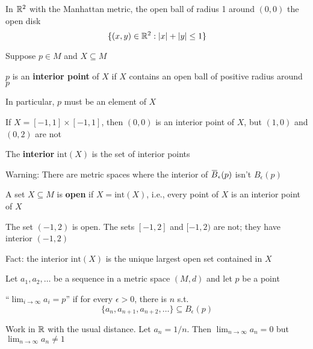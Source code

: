 \documentclass[11pt]{article}
\def \tint {\text{int}}
\begin{document}
\begin{examplle}[]
In \(\mathbb{R}^2\) with the Manhattan metric, the open ball of radius 1 around \((0,0)\) the open disk
\begin{equation*}
\{(x,y)\in\R^2:\abs{x}+\abs{y}\le 1\}
\end{equation*}
\end{examplle}

Suppose \(p\in M\) and \(X\subseteq M\)
\begin{definition}[]
\(p\) is an \textbf{interior point} of \(X\) if \(X\) contains an open ball of positive radius around \(p\)
\end{definition}

In particular, \(p\) must be an element of \(X\)


\begin{examplle}[]
If \(X=[-1,1]\times[-1,1]\), then \((0,0)\) is an interior point of \(X\), but \((1,0)\)
and \((0,2)\) are not
\end{examplle}

\begin{definition}[]
The \textbf{interior} \(\tint(X)\) is the set of interior points
\end{definition}

Warning: There are metric spaces where the interior of \(\barB_\epsilon(p)\) isn't \(B_\epsilon(p)\)

\begin{definition}[]
A set \(X\subseteq M\) is \textbf{open} if \(X=\tint(X)\), i.e., every point of \(X\) is an interior point of \(X\)
\end{definition}

\begin{examplle}[in \(\R\)]
The set \((-1,2)\) is open. The sets \([-1,2]\) and \([-1,2)\) are not; they have interior \((-1,2)\)
\end{examplle}

Fact: the interior \(\tint(X)\) is the unique largest open set contained in \(X\)

Let \(a_1,a_2,\dots\) be a sequence in a metric space \((M,d)\) and let \(p\) be a point
\begin{definition}[]
``\(\lim_{i\to\infty}a_i=p\)'' if for every \(\epsilon>0\), there is \(n\) s.t.
\begin{equation*}
\{a_n,a_{n+1},a_{n+2},\dots\}\subseteq B_\epsilon(p)
\end{equation*}
\end{definition}

\begin{examplle}[]
Work in \(\R\) with the usual distance. Let \(a_n=1/n\). Then \(\lim_{n\to\infty}a_n=0\)
but \(\lim_{n\to\infty}a_n\neq 1\)
\end{examplle}
\end{document}
